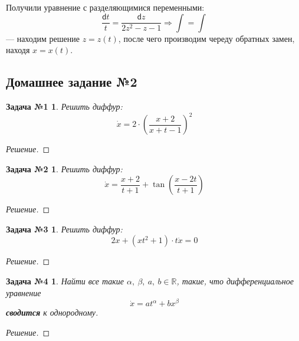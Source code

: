 \documentclass[a4paper,12pt]{article}
\newtheorem*{task1}{Задача №1}
\newtheorem*{task2}{Задача №2}
\newtheorem*{task3}{Задача №3}
\newtheorem*{task4}{Задача №4}
\newcommand{\R}{\mathbb{R}}
\renewcommand{\d}{\mathsf{d}}
\newcommand{\dx}{\dot{x}}
\newcommand{\ds}{\displaystyle}
\begin{document}
Получили уравнение с разделяющимися переменными:
\[\dfrac{\d t}{t} = \dfrac{\d z}{2z^2 - z - 1} \Longrightarrow \ds\int = \int\] --- находим решение $z = z(t)$, после чего производим череду обратных замен, находя $x = x(t)$.

\subsection{Домашнее задание №2}


\begin{task1}
	Решить диффур:
	\[\dx = 2 \cdot \left(\dfrac{x + 2}{x + t - 1}\right)^2\]
\end{task1}
\begin{proof}[Решение]

\end{proof}

\begin{task2}
	Решить диффур:
	\[\dx = \dfrac{x + 2}{t + 1} + \tan(\dfrac{x - 2t}{t + 1})\]	 
\end{task2}
\begin{proof}[Решение]
	
\end{proof}

\begin{task3}
	Решить диффур:
	\[2x + (xt^2 + 1)\cdot t\dx = 0\]
\end{task3}
\begin{proof}[Решение]
	
\end{proof}

\begin{task4}
	Найти все такие $\alpha,\ \beta,\ a,\ b \in \R$, такие, что дифференциальное уравнение
	\[\dx = at^\alpha + bx^\beta\] \textbf{сводится} к однородному.
\end{task4}
\begin{proof}[Решение]

\end{proof}
\end{document}
